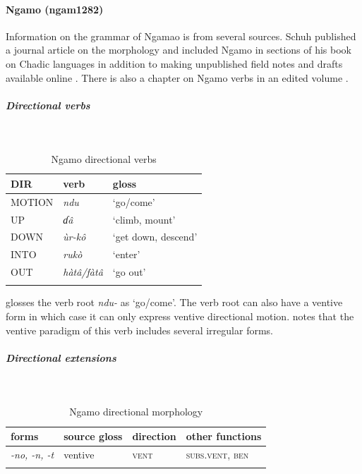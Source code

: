 \paragraph*{Ngamo (ngam1282)} \label{ngam}

Information on the grammar of Ngamao is from several sources. Schuh published a journal article on the morphology \citep{schuhDegeminationCompensatoryLengthening2005} and included Ngamo in sections of his book on Chadic languages \citep[332--353]{schuhChadicCornucopia2017} in addition to making unpublished field notes and drafts available online \citep{schuhNgamoVerbalSystem2004,schuhGudiNgamoVerb2010}. There is also a chapter on Ngamo verbs in an edited volume \citep{ibriszimowVerbNgamo2006}.

\subparagraph{Directional verbs}~



\begin{table}[H]
	\caption{Ngamo directional verbs} 
	\label{tab:ngamV}
	\begin{tabular}{lll} %
		\lsptoprule
		DIR & verb & gloss   \\ %
		\midrule
		MOTION & \textit{ndu} & `go/come' \\
		UP & \textit{ɗâ} & `climb, mount' \\
		DOWN & \textit{ùr-kô} & `get down, descend' \\
		INTO& \textit{rukò} & `enter' \\
		OUT & \textit{hàtâ/fàtâ} & `go out' \\
		\lspbottomrule
	\end{tabular}
\end{table}

\citet[336]{schuhChadicCornucopia2017} glosses the verb root \textit{ndu-} as `go/come'. The verb root can also have a ventive form in which case it can only express ventive directional motion. \citet{schuhNgamoVerbalSystem2004} notes that the ventive paradigm of this verb includes several irregular forms.

\subparagraph{Directional extensions}~



\begin{table}[H]
	\caption{Ngamo directional morphology}
	\label{tab:ngam}
	\begin{tabular}{llll} %
		\lsptoprule
		forms & source gloss & direction  & other functions  \\ %
		\midrule
		\textit{-no, -n, -t}  &  ventive  &  \textsc{vent} &   \textsc{subs.vent}, \textsc{ben}  \\
		\lspbottomrule
	\end{tabular}
\end{table} 

